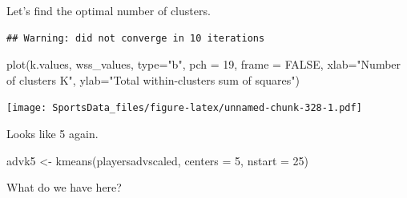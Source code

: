 \documentclass[
]{book}
\newenvironment{Shaded}{\begin{snugshade}}{\end{snugshade}}
\newcommand{\AttributeTok}[1]{\textcolor[rgb]{0.77,0.63,0.00}{#1}}
\newcommand{\CommentTok}[1]{\textcolor[rgb]{0.56,0.35,0.01}{\textit{#1}}}
\newcommand{\ConstantTok}[1]{\textcolor[rgb]{0.00,0.00,0.00}{#1}}
\newcommand{\ControlFlowTok}[1]{\textcolor[rgb]{0.13,0.29,0.53}{\textbf{#1}}}
\newcommand{\DecValTok}[1]{\textcolor[rgb]{0.00,0.00,0.81}{#1}}
\newcommand{\FunctionTok}[1]{\textcolor[rgb]{0.00,0.00,0.00}{#1}}
\newcommand{\NormalTok}[1]{#1}
\newcommand{\OtherTok}[1]{\textcolor[rgb]{0.56,0.35,0.01}{#1}}
\newcommand{\SpecialCharTok}[1]{\textcolor[rgb]{0.00,0.00,0.00}{#1}}
\newcommand{\StringTok}[1]{\textcolor[rgb]{0.31,0.60,0.02}{#1}}
\begin{document}
Let's find the optimal number of clusters.

\begin{Shaded}
\end{Shaded}

\begin{verbatim}
## Warning: did not converge in 10 iterations
\end{verbatim}

\begin{Shaded}
\begin{Highlighting}[]
\FunctionTok{plot}\NormalTok{(k.values, wss\_values,}
       \AttributeTok{type=}\StringTok{"b"}\NormalTok{, }\AttributeTok{pch =} \DecValTok{19}\NormalTok{, }\AttributeTok{frame =} \ConstantTok{FALSE}\NormalTok{, }
       \AttributeTok{xlab=}\StringTok{"Number of clusters K"}\NormalTok{,}
       \AttributeTok{ylab=}\StringTok{"Total within{-}clusters sum of squares"}\NormalTok{)}
\end{Highlighting}
\end{Shaded}

\texttt{[image: SportsData\_files/figure-latex/unnamed-chunk-328-1.pdf]}

Looks like 5 again.

\begin{Shaded}
\begin{Highlighting}[]
\NormalTok{advk5 }\OtherTok{\textless{}{-}} \FunctionTok{kmeans}\NormalTok{(playersadvscaled, }\AttributeTok{centers =} \DecValTok{5}\NormalTok{, }\AttributeTok{nstart =} \DecValTok{25}\NormalTok{)}
\end{Highlighting}
\end{Shaded}

What do we have here?
\end{document}
